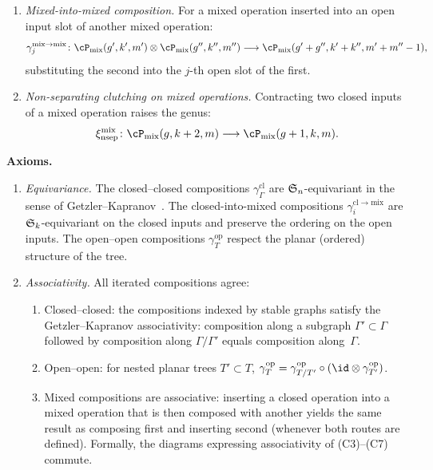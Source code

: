\begin{definition}
\begin{enumerate}[label=\textup{(C\arabic*)}]
\item \emph{Mixed-into-mixed composition.}
 For a mixed operation inserted into an open input slot of
 another mixed operation:
 \[
 \gamma^{\mathrm{mix} \to \mathrm{mix}}_j
 \colon
 \cP_{\mathrm{mix}}(g', k', m')
 \otimes \cP_{\mathrm{mix}}(g'', k'', m'')
 \longrightarrow
 \cP_{\mathrm{mix}}(g' + g'', k' + k'', m' + m'' - 1),
 \]
 substituting the second into the $j$-th open slot of the first.

\item \emph{Non-separating clutching on mixed operations.}
 Contracting two closed inputs of a mixed operation raises
 the genus:
 \[
 \xi^{\mathrm{mix}}_{\mathrm{nsep}}
 \colon
 \cP_{\mathrm{mix}}(g, k+2, m)
 \longrightarrow
 \cP_{\mathrm{mix}}(g+1, k, m).
 \]
\end{enumerate}

\medskip\noindent\textbf{Axioms.}
\begin{enumerate}[label=\textup{(A\arabic*)}]
\item \emph{Equivariance.}
 The closed--closed compositions $\gamma_\Gamma^{\mathrm{cl}}$
 are $\mathfrak{S}_n$-equivariant in the sense of
 Getzler--Kapranov~\cite{GK98}.
 The closed-into-mixed compositions $\gamma^{\mathrm{cl} \to \mathrm{mix}}_i$
 are $\mathfrak{S}_k$-equivariant on the closed inputs and preserve the
 ordering on the open inputs.
 The open--open compositions $\gamma_T^{\mathrm{op}}$ respect
 the planar (ordered) structure of the tree.

\item \emph{Associativity.}
 All iterated compositions agree:
 \begin{enumerate}[label=\textup{(\alph*)}]
 \item Closed--closed: the compositions indexed by stable graphs
 satisfy the Getzler--Kapranov associativity: composition
 along a subgraph $\Gamma' \subset \Gamma$ followed by
 composition along $\Gamma / \Gamma'$ equals composition
 along~$\Gamma$.
 \item Open--open: for nested planar trees $T' \subset T$,
 $\gamma_{T}^{\mathrm{op}}
 = \gamma_{T/T'}^{\mathrm{op}} \circ
 (\id \otimes \gamma_{T'}^{\mathrm{op}})$.
 \item Mixed compositions are associative: inserting a
 closed operation into a mixed operation that is then composed
 with another yields the same result as composing first and
 inserting second (whenever both routes are defined).
 Formally, the diagrams
 expressing associativity of (C3)--(C7) commute.
 \end{enumerate}


\end{enumerate}
\end{definition}
